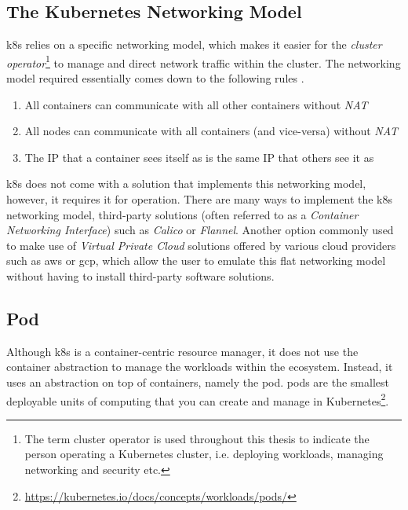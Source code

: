 \subsection{The Kubernetes Networking Model}
\label{sec:background:kubernetes:networking-model}

\Gls{k8s} relies on a specific networking model, which makes it easier for the \textit{cluster operator}\footnote{The term cluster operator is used throughout this thesis to indicate the person operating a Kubernetes cluster, i.e. deploying workloads, managing networking and security etc.} to manage and direct network traffic within the cluster. The networking model required essentially comes down to the following rules \cite{container-networking-from-scratch}.

\begin{enumerate}
  \item All containers can communicate with all other containers without \textit{NAT}
  \item All nodes can communicate with all containers (and vice-versa) without \textit{NAT}
  \item The IP that a container sees itself as is the same IP that others see it as
\end{enumerate}

\Gls{k8s} does not come with a solution that implements this networking model, however, it requires it for operation. There are many ways to implement the \gls{k8s} networking model, third-party solutions (often referred to as a \textit{Container Networking Interface}) such as \textit{Calico} or \textit{Flannel}. Another option commonly used to make use of \textit{Virtual Private Cloud} solutions offered by various cloud providers such as \gls{aws} or \gls{gcp}, which allow the user to emulate this flat networking model without having to install third-party software solutions.

\subsection{Pod}
\label{sec:background:kubernetes:pod}

Although \gls{k8s} is a container-centric resource manager, it does not use the container abstraction to manage the workloads within the ecosystem. Instead, it uses an abstraction on top of containers, namely the \gls{pod}. \Glspl{pod} are the smallest deployable units of computing that you can create and manage in Kubernetes\footnote{\url{https://kubernetes.io/docs/concepts/workloads/pods/}}. 

